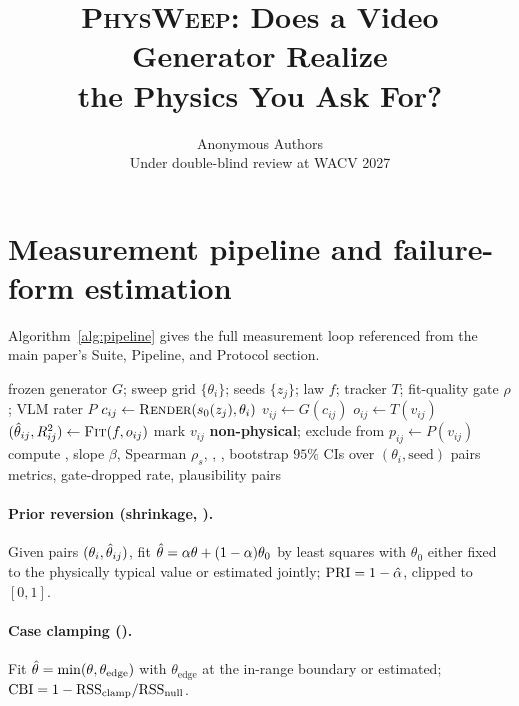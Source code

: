 \documentclass[10pt,twocolumn,letterpaper]{article}
\title{\textbf{\textsc{PhysWeep}: Does a Video Generator Realize\\[2pt]
the Physics You Ask For?}}
\author{Anonymous Authors\\ Under double-blind review at WACV 2027}
\begin{document}
\maketitlesupplementary

\section{Measurement pipeline and failure-form estimation}
\label{app:pipeline}

Algorithm~\ref{alg:pipeline} gives the full measurement loop referenced from
the main paper's Suite, Pipeline, and Protocol section.

\begin{algorithm}[H]
\caption{\textsc{PhysWeep} measurement, one system and one model}
\label{alg:pipeline}
\begin{algorithmic}[1]
\Require frozen generator $G$; sweep grid $\{\theta_i\}$; seeds $\{z_j\}$;
         law $f$; tracker $T$; fit-quality gate $\rho$; VLM rater $P$
  \State $c_{ij}\gets \textsc{Render}(s_0(z_j),\theta_i)$
  \State $v_{ij}\gets G(c_{ij})$ 
  \State $o_{ij}\gets T(v_{ij})$ 
  \State $(\hat{\theta}_{ij}, R^2_{ij})\gets \textsc{Fit}(f, o_{ij})$
    \State mark $v_{ij}$ \textbf{non-physical}; exclude from \PRE
  \EndIf
  \State $p_{ij}\gets P(v_{ij})$ 
\EndFor
\State compute \PRE, slope $\beta$, Spearman $\rho_s$, \EG, \PRI, \CBI
\State bootstrap $95\%$ CIs over $(\theta_i,\text{seed})$ pairs
\State \Return metrics, gate-dropped rate, plausibility pairs
\end{algorithmic}
\end{algorithm}

\paragraph{Prior reversion (shrinkage, \PRI).}
Given pairs $(\theta_i,\hat{\theta}_{ij})$, fit
$\hat{\theta}=\alpha\theta+(1-\alpha)\theta_0$ by least squares with $\theta_0$
either fixed to the physically typical value or estimated jointly;
$\mathrm{PRI}=1-\hat\alpha$, clipped to $[0,1]$.

\paragraph{Case clamping (\CBI).}
Fit $\hat{\theta}=\min(\theta,\theta_{\text{edge}})$ with $\theta_{\text{edge}}$
at the in-range boundary or estimated;
$\mathrm{CBI}=1-\mathrm{RSS}_{\text{clamp}}/\mathrm{RSS}_{\text{null}}$.
\end{document}
